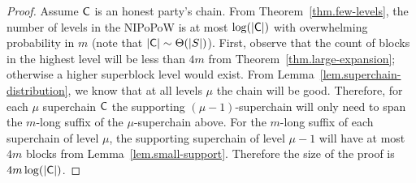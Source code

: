 \begin{proof}
    Assume $\mathsf{C}$ is an honest party's chain. From
    Theorem~\ref{thm.few-levels}, the number of levels in the NIPoPoW is at most
    $\log(|\mathsf{C}|)$ with overwhelming probability in $m$ (note that $|\mathsf{C}|
    \sim \Theta(|S|)$). First, observe that the count of blocks in the highest
    level will be less than $4m$ from Theorem~\ref{thm.large-expansion};
    otherwise a higher superblock level would exist. From
    Lemma~\ref{lem.superchain-distribution}, we know that at all levels $\mu$
    the chain will be good. Therefore, for each $\mu$ superchain $\mathsf{C}$ the
    supporting $(\mu - 1)$-superchain will only need to span the $m$-long suffix
    of the $\mu$-superchain above. For the $m$-long suffix of each superchain of
    level $\mu$, the supporting superchain of level $\mu - 1$ will have at most
    $4m$ blocks from Lemma~\ref{lem.small-support}. Therefore the size of the
    proof is $4m \log(|\mathsf{C}|)$.
\end{proof}
